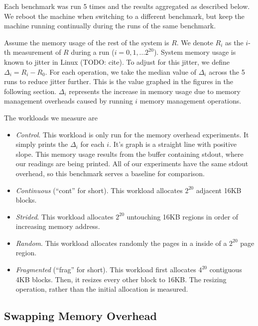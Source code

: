 \documentclass[twocolumn,11pt]{article}
\begin{document}
Each benchmark was run 5 times and the results aggregated as described below. We
reboot the machine when switching to a different benchmark, but keep the machine
running continually during the runs of the same benchmark. 

Assume the memory usage of the rest of the system is $R$. We denote $R_i$ as the
$i$-th measurement of $R$ during a run ($i = 0, 1, ... 2^{20}$). System memory
usage is known to jitter in Linux (TODO: cite). To adjust for this jitter, we
define $\Delta_i = R_i - R_0$. For each operation, we take the median value of
$\Delta_i$ across the 5 runs to reduce jitter further.  This is the value
graphed in the figures in the following section. $\Delta_i$ represents the
increase in memory usage due to memory management overheads caused by running
$i$ memory management operations.

The workloads we measure are

\begin{itemize} \item \textit{Control}. This workload is only run for the memory
overhead experiments. It simply prints the $\Delta_i$ for each $i$. It's graph
is a straight line with positive slope. This memory usage results from the
buffer containing stdout, where our readings are being printed. All of our
experiments have the same stdout overhead, so this benchmark serves a baseline
for comparison.

\item \textit{Continuous} (``cont'' for short). This workload allocates $2^{20}$
adjacent 16KB blocks.

\item \textit{Strided}. This workload allocates $2^{20}$ untouching 16KB regions
in order of increasing memory address.

\item \textit{Random}. This workload allocates randomly the pages in a
inside of a $2^{20}$ page region.

\item \textit{Fragmented} (``frag'' for short). This workload first allocates
    $4^{20}$ contiguous 4KB blocks. Then, it resizes every other block to 16KB.
        The resizing operation, rather than the initial allocation is measured.
\end{itemize}

\subsection{Swapping Memory Overhead}
\end{document}
